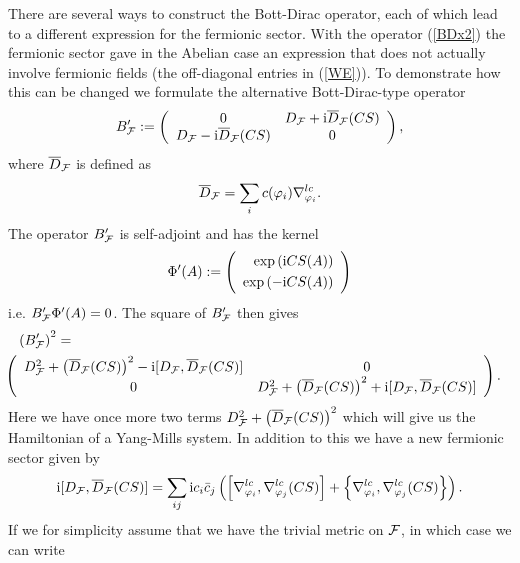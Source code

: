 \documentclass[letterpaper,11pt]{article}
\newcommand{\nn}{\nonumber}
\def\cf{{\cal F}}
\begin{document}
There are several ways to construct the Bott-Dirac operator, each of which lead to a different expression for the fermionic sector. With the operator (\ref{BDx2}) the fermionic sector gave in the Abelian case an expression that does not actually involve fermionic fields (the off-diagonal entries in (\ref{WE})). To demonstrate how this can be changed we formulate the alternative Bott-Dirac-type operator
\begin{eqnarray}
B'_{\cf} :=   \left(
\begin{array}{cc}
 0  &  D_\cf + \mathrm{i} \overline{D}_\cf(CS)  \\ 
D_\cf - \mathrm{i} \overline{D}_\cf(CS)   &  0
\end{array}
\right),
\label{solpanel}
\end{eqnarray}
where $\overline{D}_\cf$ is defined as
$$
\overline{D}_{\cf}  = \sum_i {c}(\varphi_i) \nabla^{lc}_{\varphi_i}  .
$$
The operator $B'_\cf$ is self-adjoint and has the kernel
$$
\Phi'(A) := \left(
\begin{array}{r}
\exp \left( \mathrm{i}  CS(A)\right)   
\vspace{0,1cm}
\\
 \exp\left(- \mathrm{i} CS(A)\right)   
\end{array}
\right) 
$$
i.e.
$B'_\cf\Phi'(A) =0$. The square of $B'_\cf$ then gives
\begin{eqnarray*}
\left(B'_\cf\right)^2 &=&
\nn\\
&&\hspace{-2cm}
\left(
\begin{array}{cc}
 D_\cf^2 + \left(\overline{D}_{\cf} (CS)\right)^2 - \mathrm{i}[D_\cf,\overline{D}_{\cf} (CS)]  &  0  \\ 
0   &  D_\cf^2 + \left(\overline{D}_{\cf} (CS)\right)^2 + \mathrm{i}[D_\cf,\overline{D}_{\cf} (CS)]
\end{array}
\right).
\end{eqnarray*}
Here we have once more two terms $D_\cf^2 + \left(\overline{D}_{\cf} (CS)\right)^2$ which will give us the Hamiltonian of a Yang-Mills system. In addition to this we have a new fermionic sector given by
\begin{equation}
\mathrm{i}[D_\cf,\overline{D}_{\cf} (CS)] = \sum_{ij} \mathrm{i} c_i \bar{c}_j \left( \left[\nabla^{lc}_{\varphi_i}, \nabla^{lc}_{\varphi_j}(CS)\right] + \left\{\nabla^{lc}_{\varphi_i}, \nabla^{lc}_{\varphi_j}(CS)\right\}  \right).
\label{bobbob}
\end{equation}
If we for simplicity assume that we have the trivial metric on $\cf$, in which case we can write
\end{document}
